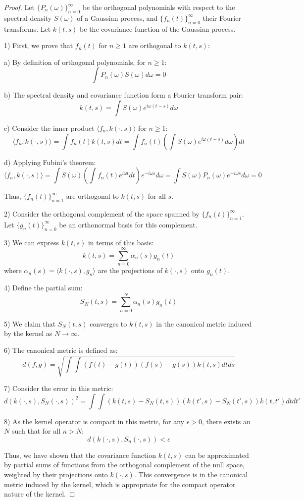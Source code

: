\begin{proof}
Let $\{P_n(\omega)\}_{n=0}^{\infty}$ be the orthogonal polynomials with respect to the spectral density $S(\omega)$ of a Gaussian process, and $\{f_n(t)\}_{n=0}^{\infty}$ their Fourier transforms. Let $k(t,s)$ be the covariance function of the Gaussian process.

1) First, we prove that $f_n(t)$ for $n \geq 1$ are orthogonal to $k(t,s)$:

   a) By definition of orthogonal polynomials, for $n \geq 1$:
      $$\int P_n(\omega)S(\omega)d\omega = 0$$

   b) The spectral density and covariance function form a Fourier transform pair:
      $$k(t,s) = \int S(\omega)e^{i\omega (t-s)}d\omega$$

   c) Consider the inner product $\langle f_n, k(\cdot,s) \rangle$ for $n \geq 1$:
      $$\langle f_n, k(\cdot,s) \rangle = \int f_n(t)k(t,s)dt = \int f_n(t) \left(\int S(\omega)e^{i\omega (t-s)}d\omega\right) dt$$

   d) Applying Fubini's theorem:
      $$\langle f_n, k(\cdot,s) \rangle = \int S(\omega) \left(\int f_n(t)e^{i\omega t}dt\right) e^{-i\omega s}d\omega = \int S(\omega)P_n(\omega)e^{-i\omega s}d\omega = 0$$

   Thus, $\{f_n(t)\}_{n=1}^{\infty}$ are orthogonal to $k(t,s)$ for all $s$.

2) Consider the orthogonal complement of the space spanned by $\{f_n(t)\}_{n=1}^{\infty}$. Let $\{g_n(t)\}_{n=0}^{\infty}$ be an orthonormal basis for this complement.

3) We can express $k(t,s)$ in terms of this basis:
   $$k(t,s) = \sum_{n=0}^{\infty} \alpha_n(s) g_n(t)$$
   where $\alpha_n(s) = \langle k(\cdot,s), g_n \rangle$ are the projections of $k(\cdot,s)$ onto $g_n(t)$.

4) Define the partial sum:
   $$S_N(t,s) = \sum_{n=0}^N \alpha_n(s) g_n(t)$$

5) We claim that $S_N(t,s)$ converges to $k(t,s)$ in the canonical metric induced by the kernel as $N \to \infty$.

6) The canonical metric is defined as:
   $$d(f,g) = \sqrt{\int\int (f(t) - g(t))(f(s) - g(s))k(t,s)dtds}$$

7) Consider the error in this metric:
   $$d(k(\cdot,s), S_N(\cdot,s))^2 = \int\int (k(t,s) - S_N(t,s))(k(t',s) - S_N(t',s))k(t,t')dtdt'$$

8) As the kernel operator is compact in this metric, for any $\epsilon > 0$, there exists an $N$ such that for all $n > N$:
   $$d(k(\cdot,s), S_n(\cdot,s)) < \epsilon$$

Thus, we have shown that the covariance function $k(t,s)$ can be approximated by partial sums of functions from the orthogonal complement of the null space, weighted by their projections onto $k(\cdot,s)$. This convergence is in the canonical metric induced by the kernel, which is appropriate for the compact operator nature of the kernel.
\end{proof}

